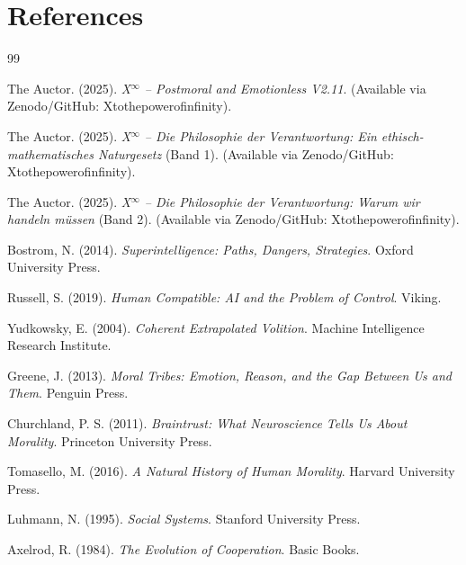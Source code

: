 \documentclass[11pt]{article}
\begin{document}
\section*{References}
\begin{thebibliography}{99}

The Auctor. (2025). \textit{X$^\infty$ -- Postmoral and Emotionless V2.11}. (Available via Zenodo/GitHub: Xtothepowerofinfinity). %

The Auctor. (2025). \textit{X$^\infty$ – Die Philosophie der Verantwortung: Ein ethisch-mathematisches Naturgesetz} (Band 1). (Available via Zenodo/GitHub: Xtothepowerofinfinity).

The Auctor. (2025). \textit{X$^\infty$ – Die Philosophie der Verantwortung: Warum wir handeln müssen} (Band 2). (Available via Zenodo/GitHub: Xtothepowerofinfinity).

Bostrom, N. (2014). \textit{Superintelligence: Paths, Dangers, Strategies}. Oxford University Press.

Russell, S. (2019). \textit{Human Compatible: AI and the Problem of Control}. Viking.

Yudkowsky, E. (2004). \textit{Coherent Extrapolated Volition}. Machine Intelligence Research Institute.

Greene, J. (2013). \textit{Moral Tribes: Emotion, Reason, and the Gap Between Us and Them}. Penguin Press.

Churchland, P. S. (2011). \textit{Braintrust: What Neuroscience Tells Us About Morality}. Princeton University Press.

Tomasello, M. (2016). \textit{A Natural History of Human Morality}. Harvard University Press.

Luhmann, N. (1995). \textit{Social Systems}. Stanford University Press.

Axelrod, R. (1984). \textit{The Evolution of Cooperation}. Basic Books.

\end{thebibliography}
\end{document}
